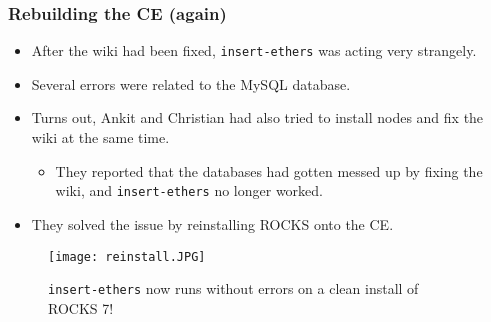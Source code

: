 \documentclass{beamer}
\begin{document}
\begin{frame}

  \frametitle{Rebuilding the CE (again)}

  \begin{itemize}
    \item After the wiki had been fixed, {\tt insert-ethers} was acting very
      strangely.
    \item Several errors were related to the MySQL database.
    \item Turns out, Ankit and Christian had also tried to install nodes and fix
      the wiki at the same time.
      \begin{itemize}
        \item They reported that the databases had gotten messed up by fixing
          the wiki, and {\tt insert-ethers} no longer worked.
      \end{itemize}
    \item They solved the issue by reinstalling ROCKS onto the CE.
  \end{itemize}

  \begin{figure}[H]
    \begin{center}
      \texttt{[image: reinstall.JPG]}
    \end{center}
    \caption{{\tt insert-ethers} now runs without errors on a clean install of
      ROCKS 7!}
  \end{figure}

\end{frame}

\end{document}
